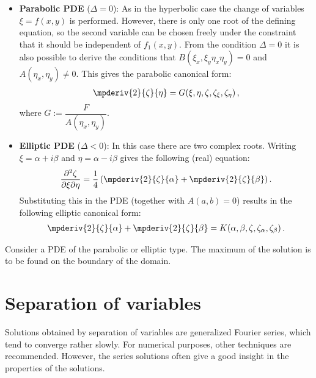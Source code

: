 {\begin{itemize}
\begin{gather}
                \end{gather}
                where $H := \dfrac{F}{2B(\xi_x,\xi_y\eta_x\eta_y)}$.
            \item\textbf{Parabolic PDE} ($\Delta=0$): As in the hyperbolic case the change of variables $\xi=f(x,y)$ is performed. However, there is only one root of the defining equation, so the second variable can be chosen freely under the constraint that it should be independent of $f_1(x,y)$. From the condition $\Delta=0$ it is also possible to derive the conditions that $B(\xi_x,\xi_y\eta_x\eta_y)=0$ and $A(\eta_x,\eta_y)\neq0$. This gives the parabolic canonical form:
                \begin{gather}
                    \label{pde:parabolic_canonical_form}
                    \mpderiv{2}{\zeta}{\eta} = G(\xi,\eta,\zeta,\zeta_\xi,\zeta_\eta)\,,
                \end{gather}
                where $G := \dfrac{F}{A(\eta_x,\eta_y)}$.
            \item\textbf{Elliptic PDE} ($\Delta<0$): In this case there are two complex roots. Writing $\xi = \alpha + i\beta$ and $\eta = \alpha - i\beta$ gives the following (real) equation: \[\frac{\partial^2\zeta}{\partial\xi\partial\eta} = \frac{1}{4}\left(\mpderiv{2}{\zeta}{\alpha} + \mpderiv{2}{\zeta}{\beta}\right).\] Substituting this in the PDE (together with $A(a,b)=0$) results in the following elliptic canonical form:
                \begin{gather}
                    \label{pde:elliptic_canonical_form}
                    \mpderiv{2}{\zeta}{\alpha} + \mpderiv{2}{\zeta}{\beta} = K(\alpha,\beta,\zeta,\zeta_\alpha,\zeta_\beta)\,.
                \end{gather}
        \end{itemize}
    }

    \begin{theorem}\label{pde:maximum_principle}
        Consider a PDE of the parabolic or elliptic type. The maximum of the solution is to be found on the boundary of the domain.
    \end{theorem}

\section{Separation of variables}\label{section:separation_of_variables}

    \begin{remark*}
        Solutions obtained by separation of variables are generalized Fourier series, which tend to converge rather slowly. For numerical purposes, other techniques are recommended. However, the series solutions often give a good insight in the properties of the solutions.
    \end{remark*}


